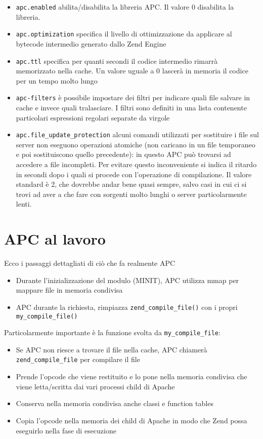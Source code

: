 \begin{itemize}
\item \verb|apc.enabled| abilita/disabilita la libreria APC. Il valore 0 disabilita la libreria.
\item \verb|apc.optimization| specifica il livello di ottimizzazione da applicare al bytecode intermedio generato dallo Zend Engine
\item \verb|apc.ttl| specifica per quanti secondi il codice intermedio rimarrà memorizzato nella cache. Un valore uguale a 0 lascerà in memoria il codice per un tempo molto lungo
\item \verb|apc-filters| è possibile impostare dei filtri per indicare quali file salvare in cache e invece quali tralasciare. I filtri sono definiti in una lista contenente particolari espressioni regolari separate da virgole
\item \verb|apc.file_update_protection| alcuni comandi utilizzati per sostituire i file sul server non eseguono operazioni atomiche (non caricano in un file temporaneo e poi sostituiscono quello precedente): in questo APC può trovarsi ad accedere a file incompleti. Per evitare questo inconveniente si indica il ritardo in secondi dopo i quali si procede con l'operazione di compilazione. Il valore standard è 2, che dovrebbe andar bene quasi sempre, salvo casi in cui ci si trovi ad aver a che fare con sorgenti molto lunghi o server particolarmente lenti.
\end{itemize}

\section*{APC al lavoro}
Ecco i passaggi dettagliati di ciò che fa realmente APC

\begin{itemize}
\item Durante l'inizializzazione del modulo (MINIT), APC utilizza mmap per mappare file in memoria condivisa

\item APC durante la richiesta, rimpiazza \verb|zend_compile_file()| con i propri \verb|my_compile_file()|
\end{itemize}

Particolarmente importante è la funzione svolta da \verb|my_compile_file|:

\begin{itemize}
\item Se APC non riesce a trovare il file nella cache, APC chiamerà \verb|zend_compile_file| per compilare il file

\item Prende l'opcode che viene restituito e lo pone nella memoria condivisa che viene letta/scritta dai vari processi child di Apache

\item Conserva nella memoria condivisa anche classi e function tables

\item Copia l'opcode nella memoria dei child di Apache in modo che Zend possa eseguirlo nella fase di esecuzione
\end{itemize}